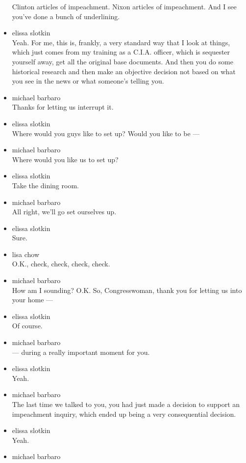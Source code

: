 \begin{itemize}
  Clinton articles of impeachment. Nixon articles of impeachment. And I
  see you've done a bunch of underlining.
\item
  elissa slotkin\\
  Yeah. For me, this is, frankly, a very standard way that I look at
  things, which just comes from my training as a C.I.A. officer, which
  is sequester yourself away, get all the original base documents. And
  then you do some historical research and then make an objective
  decision not based on what you see in the news or what someone's
  telling you.
\item
  michael barbaro\\
  Thanks for letting us interrupt it.
\item
  elissa slotkin\\
  Where would you guys like to set up? Would you like to be ---
\item
  michael barbaro\\
  Where would you like us to set up?
\item
  elissa slotkin\\
  Take the dining room.
\item
  michael barbaro\\
  All right, we'll go set ourselves up.
\item
  elissa slotkin\\
  Sure.
\item
  lisa chow\\
  O.K., check, check, check, check.
\item
  michael barbaro\\
  How am I sounding? O.K. So, Congresswoman, thank you for letting us
  into your home ---
\item
  elissa slotkin\\
  Of course.
\item
  michael barbaro\\
  --- during a really important moment for you.
\item
  elissa slotkin\\
  Yeah.
\item
  michael barbaro\\
  The last time we talked to you, you had just made a decision to
  support an impeachment inquiry, which ended up being a very
  consequential decision.
\item
  elissa slotkin\\
  Yeah.
\item
  michael barbaro\\

\end{itemize}
